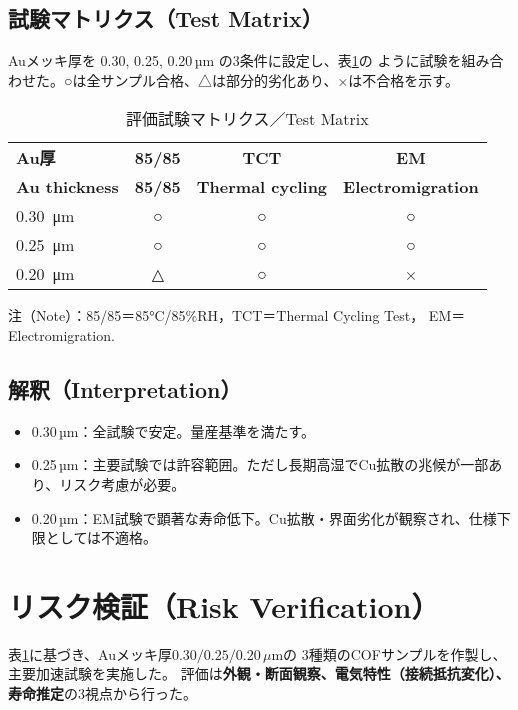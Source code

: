 \documentclass[conference]{IEEEtran}
\begin{document}
\subsection*{試験マトリクス（Test Matrix）}
Auメッキ厚を 0.30, 0.25, 0.20\,µm の3条件に設定し、表\ref{tab:test-matrix}の
ように試験を組み合わせた。○は全サンプル合格、△は部分的劣化あり、×は不合格を示す。

\begin{table}[htbp]
  \centering
  \caption{評価試験マトリクス／Test Matrix}
  \label{tab:test-matrix}
  \begin{tabular}{@{}lccc@{}}
    \toprule
    \textbf{Au厚} & \textbf{85/85} & \textbf{TCT} & \textbf{EM} \\
    \textbf{Au thickness} & \textbf{85/85} & \textbf{Thermal cycling} & \textbf{Electromigration} \\
    \midrule
    \SI{0.30}{\micro\meter} & ○ & ○ & ○ \\
    \SI{0.25}{\micro\meter} & ○ & ○ & ○ \\
    \SI{0.20}{\micro\meter} & △ & ○ & × \\
    \bottomrule
  \end{tabular}
  \vspace{2pt}

  \footnotesize
  注（Note）：85/85＝85\si{\celsius}/85\%RH，TCT＝Thermal Cycling Test，
  EM＝Electromigration.
\end{table}

\subsection*{解釈（Interpretation）}
\begin{itemize}
  \item 0.30\,µm：全試験で安定。量産基準を満たす。
  \item 0.25\,µm：主要試験では許容範囲。ただし長期高湿でCu拡散の兆候が一部あり、リスク考慮が必要。
  \item 0.20\,µm：EM試験で顕著な寿命低下。Cu拡散・界面劣化が観察され、仕様下限としては不適格。
\end{itemize}

\section{リスク検証（Risk Verification）}
表\ref{tab:test-matrix}に基づき、Auメッキ厚$0.30/0.25/0.20\,\mu$mの
3種類のCOFサンプルを作製し、主要加速試験を実施した。
評価は\textbf{外観・断面観察、電気特性（接続抵抗変化）、寿命推定}の3視点から行った。
\end{document}
